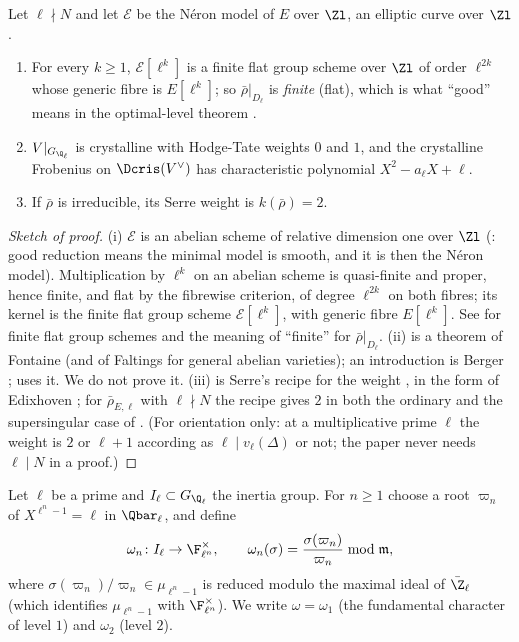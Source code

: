 \begin{theorem}\label{thm:galrep:good-at-l}
Let $\ell\nmid N$ and let $\mathcal E$ be the N\'eron model of $E$ over $\Zl$, an elliptic curve over $\Zl$.
\begin{enumerate}[label=(\roman*)]
\item For every $k\ge1$, $\mathcal E[\ell^k]$ is a finite flat group scheme over $\Zl$ of order $\ell^{2k}$ whose generic fibre is $E[\ell^k]$; so $\bar\rho|_{D_\ell}$ is
\emph{finite} (flat), which is what ``good'' means in the optimal-level theorem \cite[Theorem 3.15]{DDT}.
\item $V|_{G_{\Q_\ell}}$ is crystalline with Hodge-Tate weights $0$ and $1$, and the crystalline Frobenius on $\Dcris(V^\vee)$ has characteristic polynomial
$X^2-a_\ell X+\ell$.
\item If $\bar\rho$ is irreducible, its Serre weight is $k(\bar\rho)=2$.
\end{enumerate}
\end{theorem}

\begin{proof}[Sketch of proof]
(i) $\mathcal E$ is an abelian scheme of relative dimension one over $\Zl$ (: good reduction means the minimal model is smooth,
and it is then the N\'eron model). Multiplication by $\ell^k$ on an abelian scheme is quasi-finite and proper, hence finite, and flat by the
fibrewise criterion, of degree $\ell^{2k}$ on both fibres; its kernel is the finite flat group scheme $\mathcal E[\ell^k]$, with generic fibre $E[\ell^k]$. See
\cite[Section 2]{DDT} for finite flat group schemes and the meaning of ``finite'' for $\bar\rho|_{D_\ell}$. (ii) is a theorem of Fontaine (and of
Faltings for general abelian varieties); an introduction is Berger \cite{Berger};  uses it. We do not prove it. (iii) is
Serre's recipe for the weight \cite[Section 2]{Serre87}, in the form of Edixhoven \cite[Section 2]{Edixhoven92}; for $\bar\rho_{E,\ell}$ with $\ell\nmid N$ the
recipe gives $2$ in both the ordinary and the supersingular case of . (For orientation only: at a
multiplicative prime $\ell$ the weight is $2$ or $\ell+1$ according as $\ell\mid v_\ell(\Delta)$ or not; the paper never needs $\ell\mid N$ in a proof.)
\end{proof}

\begin{definition}\label{def:galrep:fundamental-characters}
Let $\ell$ be a prime and $I_\ell\subset G_{\Q_\ell}$ the inertia group. For $n\ge1$ choose a root $\varpi_n$ of $X^{\ell^n-1}=\ell$ in $\Qbar_\ell$, and define
\[
\omega_n\colon I_\ell\to\F_{\ell^n}^\times,\qquad\omega_n(\sigma)=\frac{\sigma(\varpi_n)}{\varpi_n}\bmod\mathfrak m,
\]
where $\sigma(\varpi_n)/\varpi_n\in\mu_{\ell^n-1}$ is reduced modulo the maximal ideal of $\bar\Z_\ell$ (which identifies $\mu_{\ell^n-1}$ with $\F_{\ell^n}^\times$). We
write $\omega=\omega_1$ (the fundamental character of level $1$) and $\omega_2$ (level $2$).
\end{definition}

